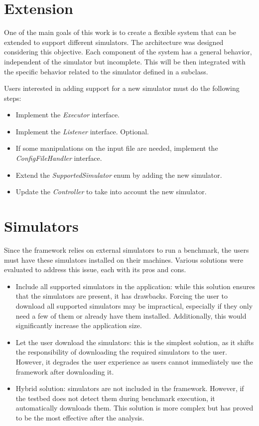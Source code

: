 \documentclass[12pt,a4paper,openright,twoside]{book}
\begin{document}
\section{Extension}

One of the main goals of this work is to create a flexible system that can be extended to support different simulators.
The architecture was designed considering this objective.
Each component of the system has a general behavior, independent of the simulator but incomplete.
This will be then integrated with the specific behavior related to the simulator defined in a subclass.

Users interested in adding support for a new simulator must do the following steps:
\begin{itemize}
  \item Implement the \emph{Executor} interface.
  \item Implement the \emph{Listener} interface. Optional.
  \item If some manipulations on the input file are needed, implement the \emph{ConfigFileHandler} interface.
  \item Extend the \emph{SupportedSimulator} enum by adding the new simulator.
  \item Update the \emph{Controller} to take into account the new simulator.
\end{itemize}

\section{Simulators}

Since the framework relies on external simulators to run a benchmark, the users must have these simulators installed on their machines. 
Various solutions were evaluated to address this issue, each with its pros and cons.
\begin{itemize}
  \item Include all supported simulators in the application: while this solution ensures that the simulators are present, it has drawbacks. 
  Forcing the user to download all supported simulators may be impractical, especially if they only need a few of them or already have them installed. 
  Additionally, this would significantly increase the application size.
  \item Let the user download the simulators: this is the simplest solution, as it shifts the responsibility of downloading the required simulators to the user.
  However, it degrades the user experience as users cannot immediately use the framework after downloading it.
  \item Hybrid solution: simulators are not included in the framework. However, if the testbed does not detect them during benchmark execution, it automatically downloads them. 
  This solution is more complex but has proved to be the most effective after the analysis.
\end{itemize}
\end{document}
